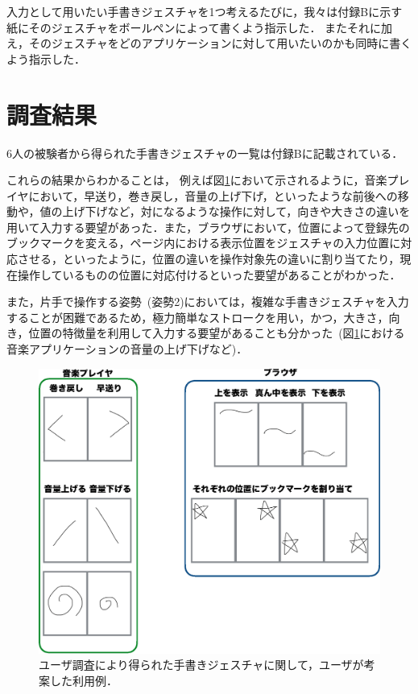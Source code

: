 入力として用いたい手書きジェスチャを1つ考えるたびに，我々は付録Bに示す紙にそのジェスチャをボールペンによって書くよう指示した．
またそれに加え，そのジェスチャをどのアプリケーションに対して用いたいのかも同時に書くよう指示した．


\section{調査結果}
6人の被験者から得られた手書きジェスチャの一覧は付録Bに記載されている．

これらの結果からわかることは，
例えば図\ref{user}において示されるように，音楽プレイヤにおいて，早送り，巻き戻し，音量の上げ下げ，といったような前後への移動や，値の上げ下げなど，対になるような操作に対して，向きや大きさの違いを用いて入力する要望があった．また，ブラウザにおいて，位置によって登録先のブックマークを変える，ページ内における表示位置をジェスチャの入力位置に対応させる，といったように，位置の違いを操作対象先の違いに割り当てたり，現在操作しているものの位置に対応付けるといった要望があることがわかった．

また，片手で操作する姿勢~(姿勢2)においては，複雑な手書きジェスチャを入力することが困難であるため，極力簡単なストロークを用い，かつ，大きさ，向き，位置の特徴量を利用して入力する要望があることも分かった~(図\ref{user}における音楽アプリケーションの音量の上げ下げなど)．

\begin{figure} [t]
 \begin{center}
  \includegraphics [width=0.7\columnwidth]{img/elicitation_example.eps}
  \caption{ユーザ調査により得られた手書きジェスチャに関して，ユーザが考案した利用例．}
  \label{user}
 \end{center}
\end{figure}

